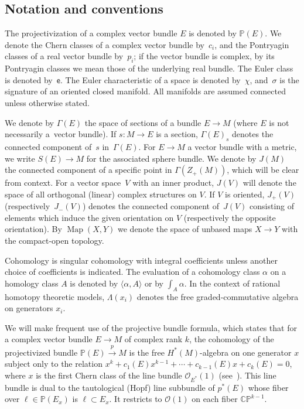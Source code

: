 \documentclass[pdftex]{sigma}%
\newcommand{\CP}{\mathbb{CP}}
\DeclareMathOperator{\Map}{Map}
\numberwithin{equation}{section}
\begin{document}
\subsection*{Notation and conventions}

 The projectivization of a complex vector bundle $E$ is denoted by $\mathbb{P}(E)$. We denote the Chern classes of a complex vector bundle by~$c_i$, and the Pontryagin classes of a real vector bundle by~$p_i$; if the vector bundle is complex, by its Pontryagin classes we mean those of the underlying real bundle. The Euler class is denoted by~$\mathsf{e}$. The Euler characteristic of a space is denoted by~$\chi$, and~$\sigma$ is the signature of an oriented closed manifold. All manifolds are assumed connected unless otherwise stated.

We denote by $\Gamma(E)$ the space of sections of a bundle $E \to M$ (where $E$ is not necessarily a~vector bundle). If $s \colon M \to E$ is a section, $\Gamma(E)_s$ denotes the connected component of~$s$ in~$\Gamma(E)$.
For $E \to M$ a vector bundle with a metric, we write $S(E) \to M$ for the associated sphere bundle. We denote by $J(M)$ the connected component of a specific point in $\Gamma(Z_+(M))$, which will be clear from context. For a vector space~$V$ with an inner product, $J(V)$ will denote the space of all orthogonal (linear) complex structures on $V$. If $V$ is oriented, $J_+(V)$ (respectively~$J_-(V)$) denotes the connected component of~$J(V)$ consisting of elements which induce the given orientation on $V$ (respectively the opposite orientation). By $\Map(X,Y)$ we denote the space of unbased maps $X \to Y$ with the compact-open topology.

Cohomology is singular cohomology with integral coefficients unless another choice of coefficients is indicated. The evaluation of a cohomology class $\alpha$ on a homology class $A$ is denoted by $\langle \alpha, A \rangle$ or by $\int_A \alpha$. In the context of rational homotopy theoretic models, $\Lambda(x_i)$ denotes the free graded-commutative algebra on generators $x_i$.

We will make frequent use of the projective bundle formula, which states that for a complex vector bundle $E \to M$ of complex rank $k$, the cohomology of the projectivized bundle $\mathbb{P}(E) \xrightarrow{p} M$ is the free $H^*(M)$-algebra on one generator $x$ subject only to the relation $x^k + c_1(E)x^{k-1} + \cdots + c_{k-1}(E)x + c_k(E) = 0$, where $x$ is the first Chern class of the line bundle $\mathcal{O}_{E^*}(1)$ (see~\cite[Definition~15.13]{D12}). This line bundle is dual
to the tautological (Hopf) line subbundle of $p^*(E)$ whose fiber over $\ell \in \mathbb{P}(E_x)$ is $\ell \subset E_x$. It restricts to $\mathcal{O}(1)$ on each fiber $\CP^{k-1}$.
\end{document}
